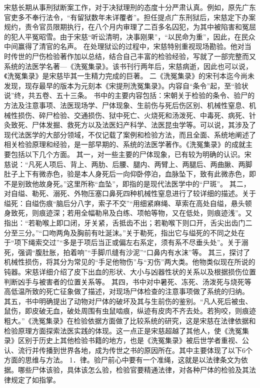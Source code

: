 \documentclass[12pt,UTF8]{ctexbook}
\begin{document}
宋慈长期从事刑狱断案工作，对于决狱理刑的态度十分严肃认真。例如，原先广东官吏多不奉行法令，“有留狱数年未详覆者”。担任提点广东刑狱后，宋慈定下办案规约，责令官员限期执行，在八个月内审理了二百多名囚犯，为其中被陷害和冤屈的犯人平冤昭雪。由于宋慈“听讼清明，决事刚果”，“以民命为重”，因此，在民众中间赢得了清官的名声。
在处理狱讼的过程中，宋慈特别重视现场勘验。他对当时传世的尸伤检验著作加以总结，结合自己丰富的检验经验，写就了一部完整而又系统的法医学名著—《洗冤集录》。该书刊行两年后，宋慈病逝，因此也可以说，《洗冤集录》是宋慈毕其一生精力完成的巨著。
二《洗冤集录》的宋刊本迄今尚未发现，现存最早的版本为元刻本《宋提刑洗冤集录》。内容自“条令”起，至“验状说”终，共五卷、五十三条。
书中的主要内容包括：宋朝关于检验的条令、验尸的方法及注意事项、法医现场学、尸体现象、生前伤与死后伤区别、机械性窒息、机械性损伤、碎尸检验、交通损伤、狱中死亡、火烧死和汤泼死、中毒死、病死、针灸致死、尸体发掘、救死方以及法医妇产科学、法医昆虫学等。可以说，其涉及了现代法医学的大部分领域，不仅记载了案例和检验方法，而且全面、系统地阐述了相关检验原理和经验，是一部早期的、系统的法医学著作。《洗冤集录》的成就主要包括以下几个方面。
其一，对一些主要的尸体现象，已有较为明确的认识。宋慈说：“凡死人项后、背上、两肋、后腰、腿内、两臂上、两腿后、两曲䐐、两脚肚子上下有微赤色，验是本人身死后一向仰卧停泊，血脉坠下，致有此微赤色，即不是别致他故身死。”这里所称“血坠”，即指的是现代法医学中的“尸斑”。
其二，对自缢、勒死、溺死、外物压塞口鼻死四种机械性窒息进行了较详细的描述。关于缢死：自缢伤痕“脑后分八字，索子不交”“用细紧麻绳、草索在高处自缢，悬头顿身致死，则痕迹深；若用全幅勒帛及白练、项帕等物，又在低处，则痕迹浅”。又指出：“若勒喉上即口闭，牙关紧，舌抵齿不出；若勒喉下则口开，舌尖出齿门二分至三分。”“口吻两角及胸前有吐涎沫。”关于勒死，指出它与缢死的不同之处在于“项下绳索交过”“多是于项后当正或偏左右系定，须有系不尽垂头处”。关于溺死，强调“腹肚胀，拍着响”“手脚爪缝有沙泥”“口鼻内有水沫”等。
其三，探讨了机械性损伤，将其分为常见的“手足他物伤”与“刃伤”两大类。他物类似现在所说的钝器。宋慈详细介绍了皮下出血的形状、大小与凶器性状的关系以及根据损伤位置判断凶手与被害者的位置关系等。
其四，书中对中暑死、冻死、汤泼死与烧死等高低温所致的死亡征象做了描述，对现场尸体检查的注意事项做了系统的归纳。
其五，书中明确提出了动物对尸体的破坏及其与生前伤的鉴别。“凡人死后被虫、鼠伤，即皮破无血，破处周围有虫鼠啮痕，纵迹有皮肉不齐去处。若狗咬，则痕迹粗大。”《洗冤集录》在检验依据方面做了比较系统的研究，这是宋慈在法律依据和检验原理方面探索法医实践的体现。这一点正是宋慈超越了其他人，使《洗冤集录》区别于历史上其他检验书籍的地方，也是《洗冤集录》被后世学者重视、公认、流行并传播到世界各地，成为传世之书的原因所在。其中主要体现了以下6个方面的思维与方法。
1．律。验尸前心中要有一个准绳，这就是以法律条文为依据。哪些尸体该验，具体该怎么验，检验官要精通法律，对各种尸体的检验及其法律规定了如指掌。
\end{document}
